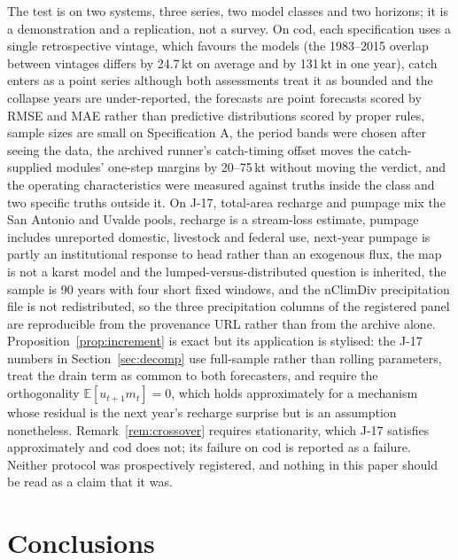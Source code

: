 \documentclass[preprint,11pt,authoryear]{elsarticle}
\theoremstyle{definition}
\theoremstyle{remark}
\newcommand{\E}{\mathbb{E}}
\begin{document}
The test is on two systems, three series, two model classes and two horizons; it is a demonstration and a replication, not a survey. On cod, each specification uses a single retrospective vintage, which favours the models (the 1983--2015 overlap between vintages differs by 24.7\,kt on average and by 131\,kt in one year), catch enters as a point series although both assessments treat it as bounded and the collapse years are under-reported, the forecasts are point forecasts scored by RMSE and MAE rather than predictive distributions scored by proper rules, sample sizes are small on Specification A, the period bands were chosen after seeing the data, the archived runner's catch-timing offset moves the catch-supplied modules' one-step margins by 20--75\,kt without moving the verdict, and the operating characteristics were measured against truths inside the class and two specific truths outside it. On J-17, total-area recharge and pumpage mix the San Antonio and Uvalde pools, recharge is a stream-loss estimate, pumpage includes unreported domestic, livestock and federal use, next-year pumpage is partly an institutional response to head rather than an exogenous flux, the map is not a karst model and the lumped-versus-distributed question is inherited, the sample is 90 years with four short fixed windows, and the nClimDiv precipitation file is not redistributed, so the three precipitation columns of the registered panel are reproducible from the provenance URL rather than from the archive alone. Proposition~\ref{prop:increment} is exact but its application is stylised: the J-17 numbers in Section~\ref{sec:decomp} use full-sample rather than rolling parameters, treat the drain term as common to both forecasters, and require the orthogonality $\E[u_{t+1}m_t]=0$, which holds approximately for a mechanism whose residual is the next year's recharge surprise but is an assumption nonetheless. Remark~\ref{rem:crossover} requires stationarity, which J-17 satisfies approximately and cod does not; its failure on cod is reported as a failure. Neither protocol was prospectively registered, and nothing in this paper should be read as a claim that it was.

\section{Conclusions}\label{sec:conclusions}
\end{document}
